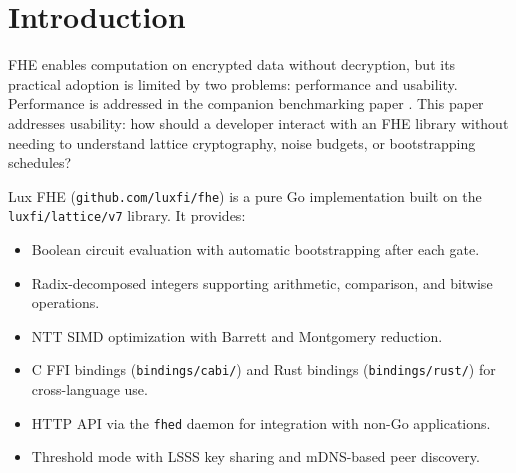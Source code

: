 \section{Introduction}


FHE enables computation on encrypted data without decryption, but its practical adoption is limited by two problems: performance and usability. Performance is addressed in the companion benchmarking paper \cite{fhe-benchmarks}. This paper addresses usability: how should a developer interact with an FHE library without needing to understand lattice cryptography, noise budgets, or bootstrapping schedules?

Lux FHE (\texttt{github.com/luxfi/fhe}) is a pure Go implementation built on the \texttt{luxfi/lattice/v7} library. It provides:
\begin{itemize}
\item Boolean circuit evaluation with automatic bootstrapping after each gate.
\item Radix-decomposed integers supporting arithmetic, comparison, and bitwise operations.
\item NTT SIMD optimization with Barrett and Montgomery reduction.
\item C FFI bindings (\texttt{bindings/cabi/}) and Rust bindings (\texttt{bindings/rust/}) for cross-language use.
\item HTTP API via the \texttt{fhed} daemon for integration with non-Go applications.
\item Threshold mode with LSSS key sharing and mDNS-based peer discovery.
\end{itemize}


